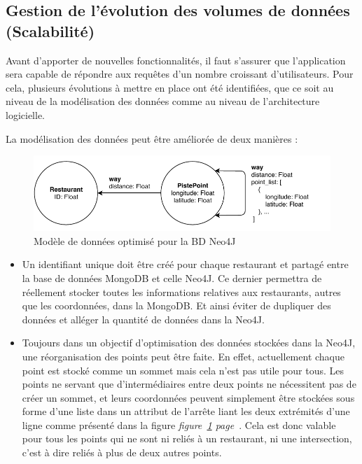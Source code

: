 \documentclass[12pt]{article}
\begin{document}
\subsection{Gestion de l'évolution des volumes de données (Scalabilité)}

    Avant d'apporter de nouvelles fonctionnalités, il faut s'assurer que l'application sera capable de répondre aux requêtes d'un nombre croissant d'utilisateurs. Pour cela, plusieurs évolutions à mettre en place ont été identifiées, que ce soit au niveau de la modélisation des données comme au niveau de l'architecture logicielle.

    La modélisation des données peut être améliorée de deux manières :

    \begin{figure}[h]
        \centering
        \includegraphics[scale=1]{images/updated_neo_model.pdf}
        \caption{\label{updated_neo_model} Modèle de données optimisé pour la BD Neo4J}
    \end{figure}
    
    \begin{itemize}
        \item Un identifiant unique doit être créé pour chaque restaurant et partagé entre la base de données MongoDB et celle Neo4J. Ce dernier permettra de réellement stocker toutes les informations relatives aux restaurants, autres que les coordonnées, dans la MongoDB. Et ainsi éviter de dupliquer des données et alléger la quantité de données dans la Neo4J.
        \item Toujours dans un objectif d'optimisation des données stockées dans la Neo4J, une réorganisation des points peut être faite. En effet, actuellement chaque point est stocké comme un sommet mais cela n'est pas utile pour tous. Les points ne servant que d'intermédiaires entre deux points ne nécessitent pas de créer un sommet, et leurs coordonnées peuvent simplement être stockées sous forme d'une liste dans un attribut de l'arrête liant les deux extrémités d'une ligne comme présenté dans la figure \emph{figure~\ref{updated_neo_model} page~\pageref{updated_neo_model}}. Cela est donc valable pour tous les points qui ne sont ni reliés à un restaurant, ni une intersection, c'est à dire reliés à plus de deux autres points.
    \end{itemize}
\end{document}
